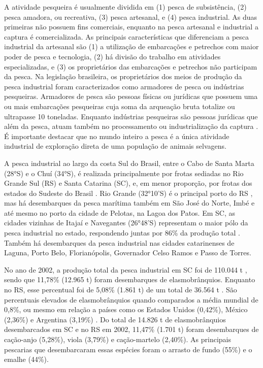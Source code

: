 \documentclass[a4paper,11pt,twoside,showtrims,onecolumn,openright,final]{memoir}
\begin{document}
A atividade pesqueira é usualmente dividida em (1) pesca de subsistência, 
(2) pesca amadora, ou recreativa, (3) pesca artesanal, e 
(4) pesca industrial. As duas primeiras não possuem fins comerciais, 
enquanto na pesca artesanal e industrial a captura é comercializada. 
As principais características que diferenciam a pesca industrial da 
artesanal são (1) a utilização de embarcações e petrechos com maior 
poder de pesca e tecnologia, (2) há divisão do trabalho em atividades 
especializadas, e (3) os proprietários das embarcações e petrechos não 
participam da pesca. Na legislação brasileira, os proprietários dos meios 
de produção da pesca industrial foram caracterizados como armadores de pesca 
ou indústrias pesqueiras. Armadores de pesca são pessoas físicas ou jurídicas 
que possuem uma ou mais embarcações pesqueiras cuja soma da arqueação bruta 
totalize ou ultrapasse 10 toneladas. Enquanto indústrias pesqueiras são pessoas 
jurídicas que além da pesca, atuam  também no processamento ou industrialização 
da captura \citep{brasil1967,mapa2001,seap2004}.  
É importante destacar que no mundo inteiro a pesca é a única atividade industrial 
de exploração direta de uma população de animais selvagens. %


A pesca industrial ao largo da costa Sul do Brasil, entre o Cabo de Santa Marta (28°S) 
e o Chuí (34°S), é realizada principalmente por frotas sediadas no Rio Grande Sul (RS) 
e Santa Catarina (SC), e, em menor proporção, por frotas dos estados do 
Sudeste do Brasil \citep{BARCELLOS1991,VALENTINI1991,kotas1991,kotas1998,haimovici1997b,miranda2003}. 
Rio Grande (32°10'S) é o principal porto do RS \citep{ceperg2003}, mas há desembarques da 
pesca marítima também em São José do Norte, Imbé e até mesmo no porto da cidade de Pelotas, 
na Lagoa dos Patos. Em SC, as cidades vizinhas de Itajaí e Navegantes (26°48'S) representam 
o maior pólo da pesca industrial no estado, respondendo juntas por 86\% da produção total
\citep{univali2003}. Também há desembarques da pesca industrial nas cidades catarinenses 
de Laguna, Porto Belo, Florianópolis, Governador Celso Ramos e Passo de Torres. 

No ano de 2002, a produção total da pesca industrial em SC foi de 110.044 t \citep{univali2003}, 
sendo que 11,78\% (12.965 t) foram desembarques de elasmobrânquios. Enquanto no RS, esse percentual 
foi de 5,08\% (1.861 t) de um total de 36.564 t \citep{ceperg2003}. São percentuais elevados de elasmobrânquios
quando comparados a média mundial de 0,8\%, ou mesmo em relação a países como os 
Estados Unidos (0,42\%), México (2,36\%) e Argentina (3,19\%) \citep{bonfil1994}. Do total de 14.826 t 
de elasmobrânquios desembarcados em SC e no RS em 2002, 11,47\% (1.701 t) foram desembarques 
de cação-anjo (5,28\%), viola (3,79\%) e cação-martelo (2,40\%). As principais pescarias 
que desembarcaram essas espécies foram o arrasto de fundo (55\%) e o emalhe (44\%).
\end{document}
